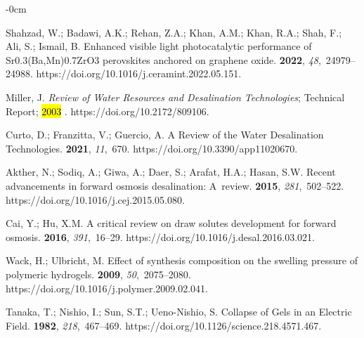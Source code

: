 \documentclass[gels,article,accept,pdftex,moreauthors]{Definitions/mdpi}
\begin{document}
\begin{adjustwidth}{-\extralength}{0cm}
\begin{thebibliography}{999}
Shahzad, W.; Badawi, A.K.; Rehan, Z.A.; Khan, A.M.; Khan, R.A.; Shah, F.; Ali,
  S.; Ismail, B.
\newblock Enhanced visible light photocatalytic performance of
  Sr0.3(Ba,Mn)0.7ZrO3 perovskites anchored on graphene oxide.
 {\bf 2022}, {\em 48},~24979--24988.
\newblock
  https://doi.org/10.1016/j.ceramint.2022.05.151.%

Miller, J.
\newblock \emph{Review of Water Resources and Desalination Technologies};
\newblock Technical Report;  \hl{2003}%
.
\newblock
  https://doi.org/10.2172/809106.%

Curto, D.; Franzitta, V.; Guercio, A.
\newblock A Review of the Water Desalination Technologies.
 {\bf 2021}, {\em 11},~670.
\newblock
  https://doi.org/10.3390/app11020670.%

Akther, N.; Sodiq, A.; Giwa, A.; Daer, S.; Arafat, H.A.; Hasan, S.W.
\newblock Recent advancements in forward osmosis desalination: A~review.
 {\bf 2015}, {\em 281},~502--522.
\newblock
  https://doi.org/10.1016/j.cej.2015.05.080.%

Cai, Y.; Hu, X.M.
\newblock A critical review on draw solutes development for forward osmosis.
 {\bf 2016}, {\em 391},~16--29.
\newblock
  https://doi.org/10.1016/j.desal.2016.03.021.%

Wack, H.; Ulbricht, M.
\newblock Effect of synthesis composition on the swelling pressure of polymeric
  hydrogels.
 {\bf 2009}, {\em 50},~2075--2080.
\newblock
  https://doi.org/10.1016/j.polymer.2009.02.041.%

Tanaka, T.; Nishio, I.; Sun, S.T.; Ueno-Nishio, S.
\newblock Collapse of Gels in an Electric Field.
 {\bf 1982}, {\em 218},~467--469.
\newblock
  https://doi.org/10.1126/science.218.4571.467.%


\end{thebibliography}
\end{adjustwidth}
\end{document}
